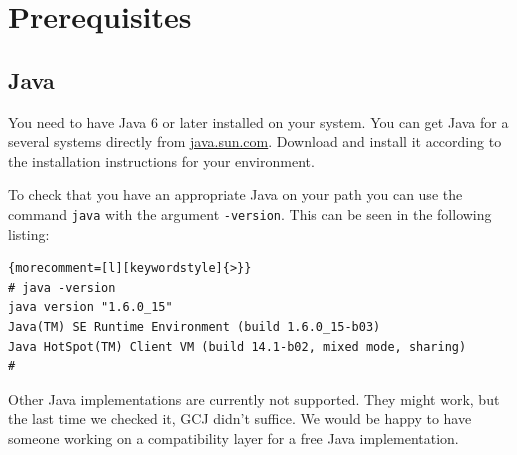 \chapter{Prerequisites}

\section{Java}

You need to have Java 6 or later installed on your
system. You can get Java for a several systems directly from
\url{java.sun.com}. Download and install it according to the
installation instructions for your environment.

To check that you have an appropriate Java on your path you can use
the command \texttt{java} with the argument \texttt{-version}. This
can be seen in the following listing:

%
\begin{lstlisting}{morecomment=[l][keywordstyle]{>}}
# java -version
java version "1.6.0_15"
Java(TM) SE Runtime Environment (build 1.6.0_15-b03)
Java HotSpot(TM) Client VM (build 14.1-b02, mixed mode, sharing)
#
\end{lstlisting}

Other Java implementations are currently not supported. They might
work, but the last time we checked it, GCJ didn't suffice. We would be
happy to have someone working on a compatibility layer for a free Java
implementation.


